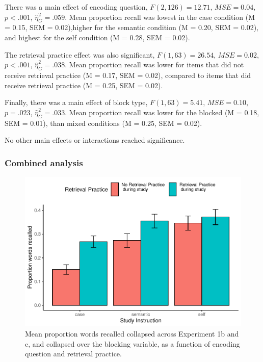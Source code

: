 \documentclass[
  man,floatsintext]{apa6}
\begin{document}
There was a main effect of encoding question, \(F(2, 126) = 12.71\), \(\mathit{MSE} = 0.04\), \(p < .001\), \(\hat{\eta}^2_G = .059\). Mean proportion recall was lowest in the case condition (M = 0.15, SEM = 0.02),higher for the semantic condition (M = 0.20, SEM = 0.02), and highest for the self condition (M = 0.28, SEM = 0.02).

The retrieval practice effect was also significant, \(F(1, 63) = 26.54\), \(\mathit{MSE} = 0.02\), \(p < .001\), \(\hat{\eta}^2_G = .038\). Mean proportion recall was lower for items that did not receive retrieval practice (M = 0.17, SEM = 0.02), compared to items that did receive retrieval practice (M = 0.25, SEM = 0.02).

Finally, there was a main effect of block type, \(F(1, 63) = 5.41\), \(\mathit{MSE} = 0.10\), \(p = .023\), \(\hat{\eta}^2_G = .033\). Mean proportion recall was lower for the blocked (M = 0.18, SEM = 0.01), than mixed conditions (M = 0.25, SEM = 0.02).

No other main effects or interactions reached significance.

\hypertarget{combined-analysis}{%
\subsubsection{Combined analysis}\label{combined-analysis}}

\begin{figure}
\centering
\includegraphics{Thesis_files/figure-latex/combined-1.pdf}
\caption{\label{fig:combined}Mean proportion words recalled collapsed across Experiment 1b and c, and collapsed over the blocking variable, as a function of encoding question and retrieval practice.}
\end{figure}
\end{document}
